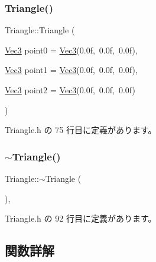 \subsubsection{\texorpdfstring{Triangle()}{Triangle()}}
{\footnotesize\ttfamily Triangle\+::\+Triangle (\begin{DoxyParamCaption}\item[{\mbox{\hyperlink{_vector3_d_8h_ab16f59e4393f29a01ec8b9bbbabbe65d}{Vec3}}}]{point0 = {\ttfamily \mbox{\hyperlink{_vector3_d_8h_ab16f59e4393f29a01ec8b9bbbabbe65d}{Vec3}}(0.0f,~0.0f,~0.0f)},  }\item[{\mbox{\hyperlink{_vector3_d_8h_ab16f59e4393f29a01ec8b9bbbabbe65d}{Vec3}}}]{point1 = {\ttfamily \mbox{\hyperlink{_vector3_d_8h_ab16f59e4393f29a01ec8b9bbbabbe65d}{Vec3}}(0.0f,~0.0f,~0.0f)},  }\item[{\mbox{\hyperlink{_vector3_d_8h_ab16f59e4393f29a01ec8b9bbbabbe65d}{Vec3}}}]{point2 = {\ttfamily \mbox{\hyperlink{_vector3_d_8h_ab16f59e4393f29a01ec8b9bbbabbe65d}{Vec3}}(0.0f,~0.0f,~0.0f)} }\end{DoxyParamCaption})\hspace{0.3cm}{\ttfamily [inline]}}



 Triangle.\+h の 75 行目に定義があります。

\mbox{\label{class_triangle_a5199760a17454f4dc94c855a57e3a152}} 
\subsubsection{\texorpdfstring{$\sim$\+Triangle()}{~Triangle()}}
{\footnotesize\ttfamily Triangle\+::$\sim$\+Triangle (\begin{DoxyParamCaption}{ }\end{DoxyParamCaption})\hspace{0.3cm}{\ttfamily [inline]}, {\ttfamily [virtual]}}



 Triangle.\+h の 92 行目に定義があります。



\subsection{関数詳解}
\mbox{\label{class_triangle_ac5d6a4c5f2bfda5cdc56c89a294fb46e}} 
